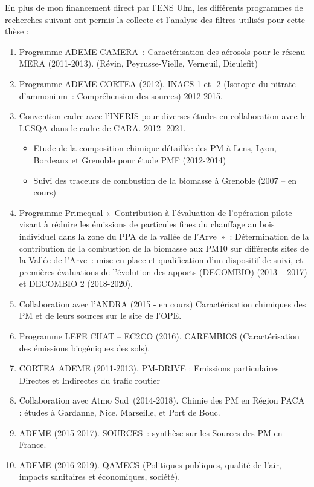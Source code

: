 
En plus de mon financement direct par l'ENS Ulm, les différents programmes de recherches
suivant ont permis la collecte et l'analyse des filtres utilisés pour cette thèse :

\begin{enumerate}
    \item Programme ADEME CAMERA : Caractérisation des aérosols pour le réseau MERA (2011-2013). (Révin, Peyrusse-Vielle, Verneuil, Dieulefit)
    \item Programme ADEME CORTEA (2012). INACS-1 et -2 (Isotopie du nitrate d’ammonium : Compréhension des sources) 2012-2015. 
    \item Convention cadre avec l’INERIS pour diverses études en collaboration avec le LCSQA dans le cadre de CARA. 2012 -2021. 
        \begin{itemize}
            \item Etude de la composition chimique détaillée des PM à Lens, Lyon, Bordeaux et Grenoble pour étude PMF (2012-2014) 
            \item Suivi des traceurs de combustion de la biomasse à Grenoble (2007 – en cours) 
        \end{itemize}
    \item Programme Primequal « Contribution à l’évaluation de l’opération pilote visant à réduire les émissions de particules fines du chauffage au bois individuel dans la zone du PPA de la vallée de l'Arve » : Détermination de la contribution de la combustion de la biomasse aux PM10 sur différents sites de la Vallée de l’Arve : mise en place et qualification d’un dispositif de suivi, et premières évaluations de l’évolution des apports (DECOMBIO) (2013 – 2017) et DECOMBIO 2 (2018-2020). 
    \item Collaboration avec l’ANDRA (2015 - en cours) Caractérisation chimiques des PM et de leurs sources sur le site de l’OPE. 
    \item Programme LEFE CHAT – EC2CO (2016). CAREMBIOS (Caractérisation des émissions biogéniques des sols). 
    \item CORTEA ADEME (2011-2013). PM-DRIVE : Emissions particulaires Directes et Indirectes du trafic routier 
    \item Collaboration avec Atmo Sud (2014-2018). Chimie des PM en Région PACA : études à Gardanne, Nice, Marseille, et Port de Bouc. 
    \item ADEME (2015-2017). SOURCES : synthèse sur les Sources des PM en France. 
    \item ADEME (2016-2019). QAMECS (Politiques publiques, qualité de l’air, impacts sanitaires et économiques, société). 

\end{enumerate}
